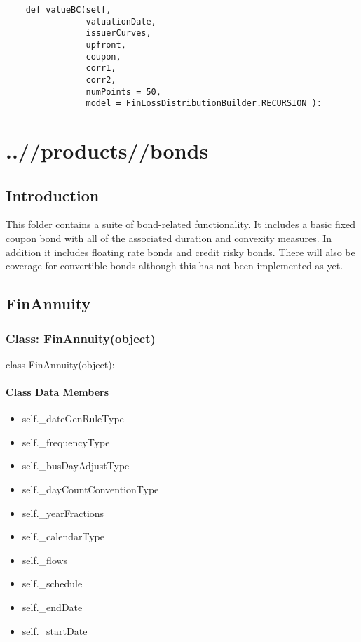\documentclass[twoside,11pt]{book}
\begin{document}
\begin{lstlisting}
    def valueBC(self, 
                valuationDate,
                issuerCurves,
                upfront,
                coupon,
                corr1,
                corr2,
                numPoints = 50,
                model = FinLossDistributionBuilder.RECURSION ):
\end{lstlisting}


\chapter{..//products//bonds}
\section{Introduction}
This folder contains a suite of bond-related functionality. It includes a basic fixed coupon bond with all of the associated duration and convexity measures. In addition it includes floating rate bonds and credit risky bonds. There will also be coverage for convertible bonds although this has not been implemented as yet.

\newpage
\section{FinAnnuity}

\subsection{Class: FinAnnuity(object)}
class FinAnnuity(object):

\subsubsection{Class Data Members}
\begin{itemize}
\item{self.\_dateGenRuleType}
\item{self.\_frequencyType}
\item{self.\_busDayAdjustType}
\item{self.\_dayCountConventionType}
\item{self.\_yearFractions}
\item{self.\_calendarType}
\item{self.\_flows}
\item{self.\_schedule}
\item{self.\_endDate}
\item{self.\_startDate}
\end{itemize}
\end{document}
